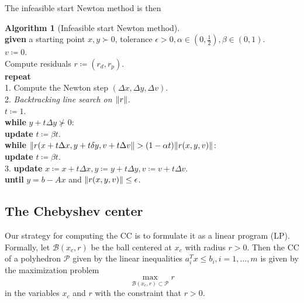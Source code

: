 \documentclass[11pt]{amsart}
\theoremstyle{definition}
\newtheorem{algorithm}{Algorithm}
\theoremstyle{remark}
\newcommand{\ind}{\hspace*{0.5cm}}
\newcommand{\transpose}{T}
\begin{document}
    The infeasible start Newton method is then
    \begin{algorithm}[Infeasible start Newton method]
    \label{a:infeasible}\mbox{}\\
        \ind \textbf{given} a starting point $x, y \succ 0$, tolerance $\epsilon > 0, \alpha \in (0, \frac{1}{2}), \beta \in (0, 1)$. \\
        \ind $v \coloneqq 0$. \\
        \ind Compute residuals $r \coloneqq (r_d, r_p)$. \\
        \ind \textbf{repeat} \\
        \ind\ind 1. Compute the Newton step $(\Delta x, \Delta y, \Delta v)$. \\
        \ind\ind 2. \emph{Backtracking line search on $\norm{r}$}. \\
        \ind\ind\ind $t \coloneqq 1$. \\
        \ind\ind\ind \textbf{while } $y + t\Delta y \not\succ 0$: \\
        \ind\ind\ind\ind \textbf{update } $t \coloneqq \beta t$. \\
        \ind\ind\ind \textbf{while} $\norm{r(x + t\Delta x, y + t \delta y, v + t \Delta v} > (1 - \alpha t)\norm{r(x, y, v)}$: \\
        \ind\ind\ind\ind \textbf{update } $t \coloneqq \beta t$. \\
        \ind\ind 3. \textbf{update} $x \coloneqq x +  t\Delta x, y \coloneqq y + t \Delta y, v \coloneqq v + t \Delta v.$ \\
        \ind \textbf{until} $y = b - Ax$ and $\norm{r(x, y, v)} \leq \epsilon$.
    \end{algorithm}

    \subsection{The Chebyshev center}\label{ss:computing_cc}
        Our strategy for computing the CC is to formulate it as a linear program (LP). Formally, let $\mathcal{B}(x_c, r)$ be the ball centered at $x_c$ with radius $r > 0$. Then the CC of a polyhedron $\mathcal{P}$ given by the linear inequalities $a_i^\transpose x \leq b_i, i = 1, \dots, m$ is given by the maximization problem
        \begin{equation*}
            \max_{\mathcal{B}(x_c, r) \subset \mathcal{P}} r
        \end{equation*}
        in the variables $x_c$ and $r$ with the constraint that $r > 0$. 
\end{document}
